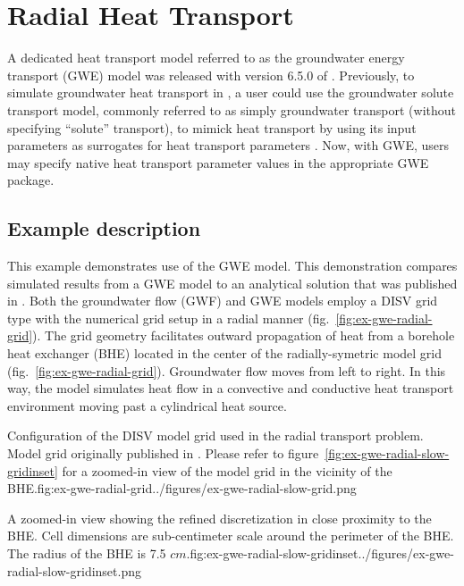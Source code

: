 \section{Radial Heat Transport}

A dedicated heat transport model referred to as the groundwater energy transport (GWE) model was released with version 6.5.0 of \mf. Previously, to simulate groundwater heat transport in \mf, a user could use the groundwater solute transport model, commonly referred to as simply groundwater transport (without specifying ``solute'' transport), to mimick heat transport by using its input parameters as surrogates for heat transport parameters \citep{modflow6gwt, ma2010, langevin2008seawat}. Now, with GWE, users may specify native heat transport parameter values in the appropriate GWE package.

\subsection{Example description}

This example demonstrates use of the GWE model.  This demonstration compares simulated results from a GWE model to an analytical solution that was published in \cite{alKhoury2020}.  Both the groundwater flow (GWF) and GWE models employ a DISV grid type \citep{modflow6software} with the numerical grid setup in a radial manner (fig.~\ref{fig:ex-gwe-radial-grid}). The grid geometry facilitates outward propagation of heat from a borehole heat exchanger (BHE) \citep{hechtMendez2010} located in the center of the radially-symetric model grid (fig.~\ref{fig:ex-gwe-radial-grid}). Groundwater flow moves from left to right. In this way, the model simulates heat flow in a convective and conductive heat transport environment moving past a cylindrical heat source.

\begin{StandardFigure}{
    Configuration of the DISV model grid used in the radial transport problem.  Model grid originally published in \cite{alKhoury2020}.  Please refer to figure~\ref{fig:ex-gwe-radial-slow-gridinset} for a zoomed-in view of the model grid in the vicinity of the BHE.}{fig:ex-gwe-radial-grid}{../figures/ex-gwe-radial-slow-grid.png}
\end{StandardFigure}

\begin{StandardFigure}{
    A zoomed-in view showing the refined discretization in close proximity to the BHE.  Cell dimensions are sub-centimeter scale around the perimeter of the BHE.  The radius of the BHE is 7.5 $cm$.}{fig:ex-gwe-radial-slow-gridinset}{../figures/ex-gwe-radial-slow-gridinset.png}
\end{StandardFigure}

